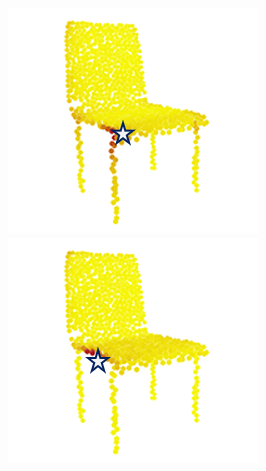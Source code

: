 \documentclass[letterpaper]{article}
\begin{document}
\begin{figure}[htbp]
\begin{center}
\begin{minipage}[b]{0.8\linewidth}
\begin{center}
\begin{minipage}[b]{0.12\linewidth}
\end{minipage}
\begin{minipage}[b]{0.12\linewidth}
\begin{center}
\includegraphics[width=1.0\linewidth]{images/atten_pic/chair_feature_1.png}
\end{center}
\end{minipage}
\begin{minipage}[b]{0.12\linewidth}
\begin{center}
\includegraphics[width=1.0\linewidth]{images/atten_pic/chair_feature_2.png}

\end{center}
\end{minipage}
\end{center}
\end{minipage}
\end{center}
\end{figure}
\end{document}
